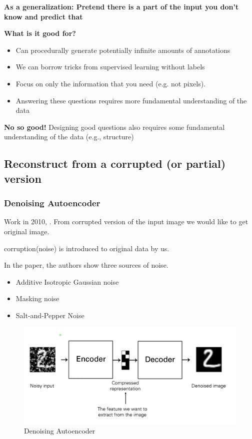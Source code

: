 \documentclass{article}
\begin{document}
\textbf{As a generalization: Pretend there is a part of the input
you don't know and predict that}
 
\textbf{What is it good for?}
\begin{itemize}
   \item Can procedurally generate potentially infinite amounts of annotations
   \item We can borrow tricks from supervised learning without labels
   \item Focus on only the information that you need (e.g. not pixels).
   \item Answering these questions requires more fundamental understanding of the data
\end{itemize}
 
\textbf{No so good!}
Designing good questions also requires some fundamental understanding of the data
(e.g., structure)
 
\subsection{Reconstruct from a corrupted (or partial) version}
 
\subsubsection{Denoising Autoencoder}
\label{sec:subsubsections}
 
Work in 2010, \cite{JMLR:v11:vincent10a}.
From corrupted version of the input image we would like to
get original image.
 
corruption(noise) is introduced to original data by us.
 
In the paper, the authors show three sources of noise.
\begin{itemize}
   \item Additive Isotropic Gaussian noise
   \item Masking noise
   \item Salt-and-Pepper Noise
\end{itemize}
 
\begin{figure}[H]
   \centering
   \includegraphics[width=0.8\linewidth]{figures/denoising_autoencoder.png}
   \caption{ Denoising Autoencoder}
   \end{figure}
 
\end{document}
